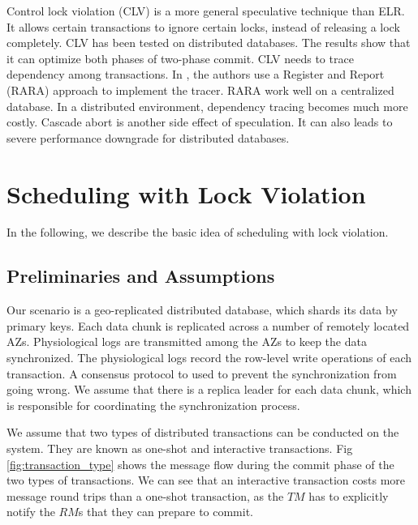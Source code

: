 \documentclass[conference]{IEEEtran}
\begin{document}
Control lock violation (CLV) \cite{CLV:conf/sigmod/GraefeLKTV13} is a more general speculative technique than ELR.
It allows certain transactions to ignore certain locks, instead of releasing a lock completely.
CLV has been tested on distributed databases. The results show that it can optimize both phases of two-phase commit.
CLV needs to trace dependency among transactions.
In \cite{CLV:conf/sigmod/GraefeLKTV13}, the authors use a Register and Report (RARA) approach \cite{HeckatonMVCC:journals/pvldb/LarsonBDFPZ11} to implement the tracer.
RARA work well on a centralized database. In a distributed environment, dependency tracing becomes much more costly.
Cascade abort is another side effect of speculation. It can also leads to severe performance downgrade for distributed databases.


\section{Scheduling with Lock Violation}
\label{sec:non_strict}

In the following, we describe the basic idea of scheduling with lock violation.

\subsection{Preliminaries and Assumptions}
Our scenario is a geo-replicated distributed database, which shards its data by primary keys.
Each data chunk is replicated across a number of remotely located AZs.
Physiological logs are transmitted among the AZs to keep the data synchronized.
The physiological logs record the row-level write operations of each transaction.
A consensus protocol to used to prevent the synchronization from going wrong.
We assume that there is a replica leader for each data chunk, which is responsible for coordinating the synchronization process.

We assume that two types of distributed transactions can be conducted on the system. They are known as one-shot and interactive transactions.
Fig \ref{fig:transaction_type} shows the message flow during the commit phase of the two types of transactions.
We can see that an interactive transaction costs more message round trips than a one-shot transaction,
as the $TM$ has to explicitly notify the $RM$s that they can prepare to commit.
\end{document}
